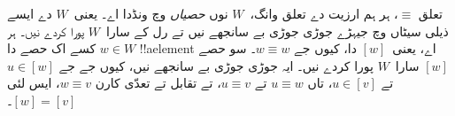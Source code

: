 \documentclass[../../../include/open-logic-section]{subfiles}
\begin{document}
تعلق $\equiv$، ہر ہم ارزیت دے تعلق وانگ،~$W$ نوں \emph{حصیاں} وچ ونڈدا اے۔ یعنی~$W$ دے ایسے ذیلی سیٹاں وچ جیہڑے جوڑی جوڑی بے سانجھے نیں تے رل کے سارا~$W$ پورا کردے نیں۔ ہر $w \in W$ کسے اک حصے دا !!a{element} اے، یعنی~$[w]$ دا، کیوں جے $w \equiv w$۔ سو حصے $[w]$ سارا~$W$ پورا کردے نیں۔ ایہ جوڑی جوڑی بے سانجھے نیں، کیوں جے جے
$u \in [w]$ تے $u \in [v]$، تاں $u \equiv w$ تے $u \equiv v$، تے تقابل تے تعدّی کارن $w \equiv v$، ایس لئی $[w] = [v]$۔
\end{document}
